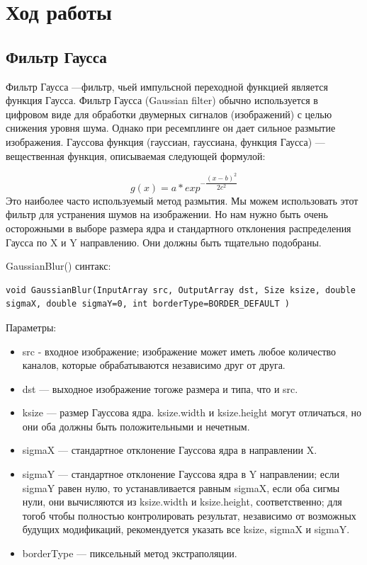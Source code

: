 \documentclass[14pt,a4paper,report]{report}
\begin{document}
\clearpage

\section{Ход работы}

\subsection{Фильтр Гаусса}
Фильтр Гаусса —фильтр, чьей импульсной переходной функцией является функция Гаусса. Фильтр Гаусса (Gaussian filter) обычно используется в цифровом виде для обработки двумерных сигналов (изображений) с целью снижения уровня шума. Однако при ресемплинге он дает сильное размытие изображения. 
Гауссова функция (гауссиан, гауссиана, функция Гаусса) — вещественная функция, описываемая следующей формулой:

$$ g(x) = a*exp^{-\dfrac{(x-b)^2}{2c^2}} $$
Это наиболее часто используемый метод размытия. Мы можем использовать этот фильтр для устранения шумов на изображении. Но нам нужно быть очень осторожными в выборе размера ядра и стандартного отклонения распределения Гаусса по X и Y направлению. Они должны быть тщательно подобраны.

GaussianBlur() синтакс:

\begin{lstlisting}
void GaussianBlur(InputArray src, OutputArray dst, Size ksize, double sigmaX, double sigmaY=0, int borderType=BORDER_DEFAULT )
\end{lstlisting}
Параметры:
\begin{itemize}
\item src - входное изображение; изображение может иметь любое количество каналов, которые обрабатываются независимо друг от друга.

\item dst — выходное изображение тогоже размера и типа, что и src.

\item ksize — размер Гауссова ядра. ksize.width и ksize.height могут отличаться, но они оба должны быть положительными и нечетным. 

\item sigmaX — стандартное отклонение Гауссова ядра в направлении X.

\item sigmaY — стандартное отклонение Гауссова ядра в Y направлении; если sigmaY равен нулю, то устанавливается равным sigmaX, если оба сигмы нули, они вычисляются из ksize.width и ksize.height, соответственно; для тогоб чтобы полностью контролировать результат, независимо от возможных будущих модификаций, рекомендуется указать все ksize, sigmaX и sigmaY.

\item borderType — пиксельный метод экстраполяции.
\end{itemize}
\clearpage
\end{document}

